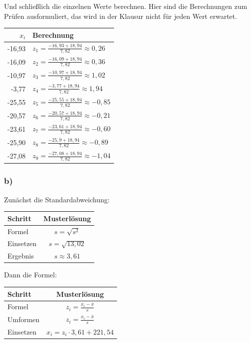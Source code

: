 \documentclass[
  11pt,
  ngerman,
  a4paper,
]{report}
\begin{document}
Und schließlich die einzelnen Werte berechnen. Hier sind die Berechnungen zum Prüfen ausformuliert, das wird in der Klausur nicht für jeden Wert erwartet.

\begin{table}[H]
\centering
\begin{tabular}{rl}
\toprule
$x_i$ & Berechnung\\
\midrule
-16,93 & $z_{1}=\frac{-16{,}93+18{,}94}{7{,}82}\approx0{,}26$\\
-16,09 & $z_{2}=\frac{-16{,}09+18{,}94}{7{,}82}\approx0{,}36$\\
-10,97 & $z_{3}=\frac{-10{,}97+18{,}94}{7{,}82}\approx1{,}02$\\
-3,77 & $z_{4}=\frac{-3{,}77+18{,}94}{7{,}82}\approx1{,}94$\\
-25,55 & $z_{5}=\frac{-25{,}55+18{,}94}{7{,}82}\approx-0{,}85$\\
-20,57 & $z_{6}=\frac{-20{,}57+18{,}94}{7{,}82}\approx-0{,}21$\\
-23,61 & $z_{7}=\frac{-23{,}61+18{,}94}{7{,}82}\approx-0{,}60$\\
-25,90 & $z_{8}=\frac{-25{,}9+18{,}94}{7{,}82}\approx-0{,}89$\\
-27,08 & $z_{9}=\frac{-27{,}08+18{,}94}{7{,}82}\approx-1{,}04$\\
\bottomrule
\end{tabular}
\end{table}

\hypertarget{b-8}{%
\subsubsection{b)}\label{b-8}}

Zunächst die Standardabweichung:

\begin{table}[H]
\centering
\begin{tabular}{lc}
\toprule
Schritt & Musterlösung\\
\midrule
Formel & $s=\sqrt{s^2}$\\
Einsetzen & $s=\sqrt{13{,}02}$\\
Ergebnis & $s\approx3{,}61$\\
\bottomrule
\end{tabular}
\end{table}

Dann die Formel:

\begin{table}[H]
\centering
\begin{tabular}{lc}
\toprule
Schritt & Musterlösung\\
\midrule
Formel & $z_{i} = \frac{x_{i} - \bar{x}}{s}$\\
Umformen & $z_{i} = \frac{x_{i} - \bar{x}}{s}$\\
Einsetzen & $x_{i} = z_{i} \cdot 3{,}61 + 221{,}54$\\
\bottomrule
\end{tabular}
\end{table}
\end{document}
